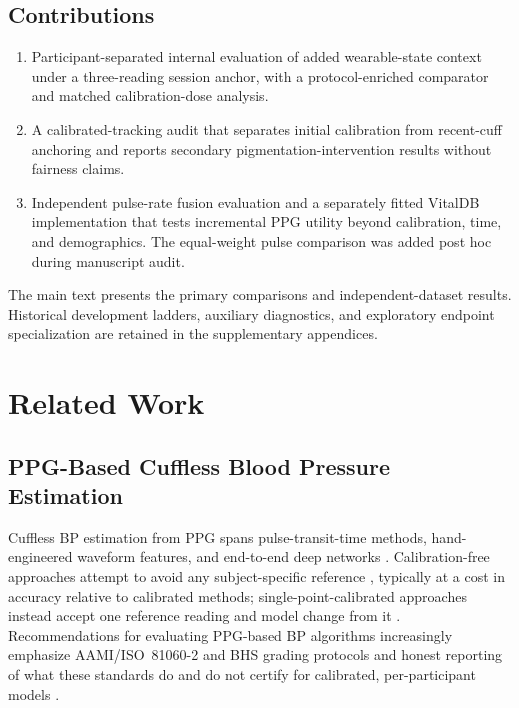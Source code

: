\documentclass[journal]{IEEEtran}
\begin{document}
\subsection{Contributions}
\begin{enumerate}
\item Participant-separated internal evaluation of added wearable-state context under a three-reading session anchor, with a protocol-enriched comparator and matched calibration-dose analysis.
\item A calibrated-tracking audit that separates initial calibration from recent-cuff anchoring and reports secondary pigmentation-intervention results without fairness claims.
\item Independent pulse-rate fusion evaluation and a separately fitted VitalDB implementation that tests incremental PPG utility beyond calibration, time, and demographics. The equal-weight pulse comparison was added post hoc during manuscript audit.
\end{enumerate}
The main text presents the primary comparisons and independent-dataset results. Historical development ladders, auxiliary diagnostics, and exploratory endpoint specialization are retained in the supplementary appendices.
\section{Related Work}
\label{sec:related}
\subsection{PPG-Based Cuffless Blood Pressure Estimation}
Cuffless BP estimation from PPG spans pulse-transit-time methods, hand-engineered waveform features, and end-to-end deep networks \cite{elgendi2019ppg,mukkamala2015toward}. Calibration-free approaches attempt to avoid any subject-specific reference \cite{calfree2023}, typically at a cost in accuracy relative to calibrated methods; single-point-calibrated approaches instead accept one reference reading and model change from it \cite{onetimecal2023,avct2026}. Recommendations for evaluating PPG-based BP algorithms increasingly emphasize AAMI/ISO~81060-2 and BHS grading protocols and honest reporting of what these standards do and do not certify for calibrated, per-participant models \cite{recommendations2024}.
\end{document}
